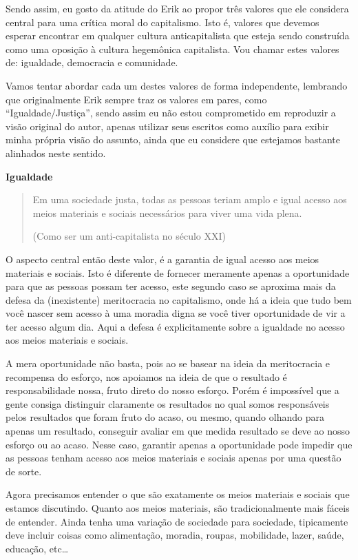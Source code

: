 Sendo assim, eu gosto da atitude do Erik ao propor três valores que ele considera central para uma crítica moral do capitalismo. Isto é, valores que devemos esperar encontrar em qualquer cultura anticapitalista que esteja sendo construída como uma oposição à cultura hegemônica capitalista. Vou chamar estes valores de: igualdade, democracia e comunidade.

Vamos tentar abordar cada um destes valores de forma independente, lembrando que originalmente Erik sempre traz os valores em pares, como “Igualdade/Justiça”, sendo assim eu não estou comprometido em reproduzir a visão original do autor, apenas utilizar seus escritos como auxílio para exibir minha própria visão do assunto, ainda que eu considere que estejamos bastante alinhados neste sentido.

\textbf{Igualdade}

\begin{quote}
Em uma sociedade justa, todas as pessoas teriam amplo e igual acesso aos meios materiais e sociais necessários para viver uma vida plena.

(Como ser um anti-capitalista no século XXI)
\end{quote}

O aspecto central então deste valor, é a garantia de igual acesso aos meios materiais e sociais. Isto é diferente de fornecer meramente apenas a oportunidade para que as pessoas possam ter acesso, este segundo caso se aproxima mais da defesa da (inexistente) meritocracia no capitalismo, onde há a ideia que tudo bem você nascer sem acesso à uma moradia digna se você tiver oportunidade de vir a ter acesso algum dia. Aqui a defesa é explicitamente sobre a igualdade no acesso aos meios materiais e sociais.

A mera oportunidade não basta, pois ao se basear na ideia da meritocracia e recompensa do esforço, nos apoiamos na ideia de que o resultado é responsabilidade nossa, fruto direto do nosso esforço. Porém é impossível que a gente consiga distinguir claramente os resultados no qual somos responsáveis pelos resultados que foram fruto do acaso, ou mesmo, quando olhando para apenas um resultado, conseguir avaliar em que medida resultado se deve ao nosso esforço ou ao acaso. Nesse caso, garantir apenas a oportunidade pode impedir que as pessoas tenham acesso aos meios materiais e sociais apenas por uma questão de sorte.

Agora precisamos entender o que são exatamente os meios materiais e sociais que estamos discutindo. Quanto aos meios materiais, são tradicionalmente mais fáceis de entender. Ainda tenha uma variação de sociedade para sociedade, tipicamente deve incluir coisas como alimentação, moradia, roupas, mobilidade, lazer, saúde, educação, etc…

